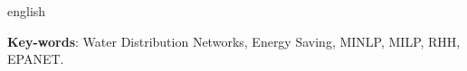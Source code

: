 \begin{resumo}[Abstract]
\begin{otherlanguage*}{english}
	
\noindent
\noindent


\vspace{\onelineskip}

\noindent 
\textbf{Key-words}: Water Distribution Networks, Energy Saving, MINLP, MILP, RHH, EPANET.
\end{otherlanguage*}
\end{resumo}


